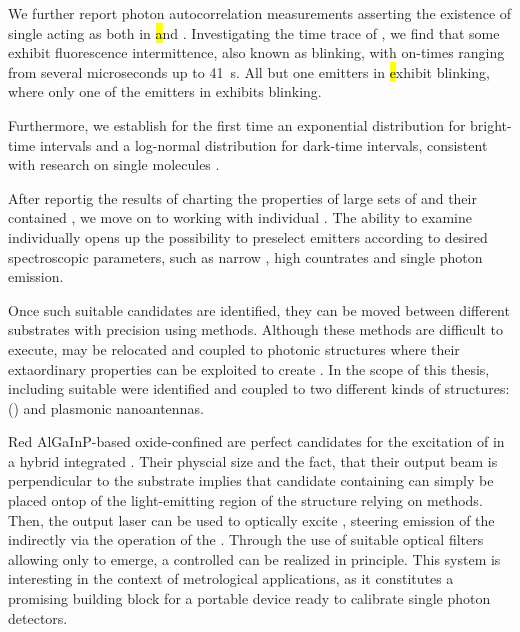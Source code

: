    We further report photon autocorrelation measurements asserting the existence of single \sivs acting as \sps both in \hl and \vl.
   Investigating the time trace of \siv \pl, we find that some \sivs exhibit fluorescence intermittence, also known as blinking, with on-times ranging from several microseconds up to \SI{41}{s}. All but one emitters in \hl exhibit blinking, where only one of the emitters in \vl exhibits blinking.

   Furthermore, we establish for the first time an exponential distribution for bright-time intervals and a log-normal distribution for dark-time intervals, consistent with research on single molecules \cite{Wong2013}.


   After reportig the results of charting the properties of large sets of \nds and their contained \sivs, we move on to working with individual \nds.
   The ability to examine \sivs individually opens up the possibility to preselect emitters according to desired spectroscopic parameters, such as narrow \lws, high countrates and single photon emission.

   Once such suitable candidates are identified, they can be moved between different substrates with precision using \pp methods. Although these methods are difficult to execute, \sivs may be relocated and coupled to photonic structures where their extaordinary properties can be exploited to create \sps. In the scope of this thesis, \nds including suitable \sivs were identified and coupled to two different kinds of structures: \Vcsels (\VCSELs) and plasmonic nanoantennas.


   Red AlGaInP-based oxide-confined \VCSELs are perfect candidates for the excitation of \sivs in a hybrid integrated \sps. Their physcial size and the fact, that their output beam is perpendicular to the substrate implies that candidate \nds containing \sivs can simply be placed ontop of the light-emitting region of the structure relying on \pp methods. Then, the \VCSELs output laser can be used to optically excite \sivs, steering emission of the \siv indirectly via the operation of the \VCSEL. Through the use of suitable optical filters allowing only \siv \fl to emerge, a controlled \sps can be realized in principle. This system is interesting in the context of metrological applications, as it constitutes a promising building block for a portable device ready to calibrate single photon detectors.

